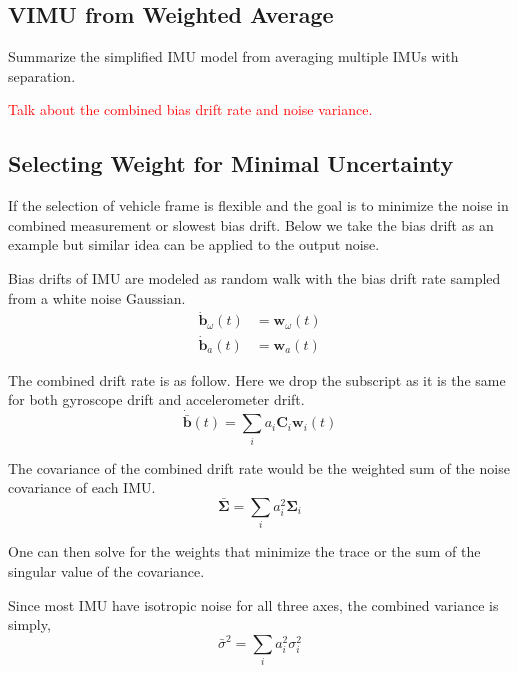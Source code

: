 \documentclass[conference]{IEEEtran}
\begin{document}
\subsection{VIMU from Weighted Average}\label{AA}



Summarize the simplified IMU model from averaging multiple IMUs with separation.

\textcolor{red}{Talk about the combined bias drift rate and noise variance.}

\subsection{Selecting Weight for Minimal Uncertainty}\label{solve_weight_by_noise}

If the selection of vehicle frame is flexible and the goal is to minimize the noise in combined measurement or slowest bias drift. Below we take the bias drift as an example but similar idea can be applied to the output noise.

Bias drifts of IMU are modeled as random walk with the bias drift rate sampled from a white noise Gaussian.
\begin{equation}
\begin{split}
    \dot{\textbf{b}}_\omega(t) &= \textbf{w}_\omega(t) \\
    \dot{\textbf{b}}_a(t) &= \textbf{w}_a(t)
\end{split}
\end{equation}

The combined drift rate is as follow. Here we drop the subscript as it is the same for both gyroscope drift and accelerometer drift.
\begin{equation}
    \dot{\bar{\textbf{b}}}(t) = \sum_i{a_i \textbf{C}_i \textbf{w}_i(t)}
\end{equation}

The covariance of the combined drift rate would be the weighted sum of the noise covariance of each IMU.
\begin{equation}
    \bar{\bm{\Sigma}} = \sum_i{a_i^2 \bm{\Sigma}_i}
\end{equation}

One can then solve for the weights that minimize the trace or the sum of the singular value of the covariance.

Since most IMU have isotropic noise for all three axes, the combined variance is simply,
\begin{equation}
    \bar{\sigma}^2 = \sum_i{a_i^2 \sigma_i^2}
\end{equation}
\end{document}
